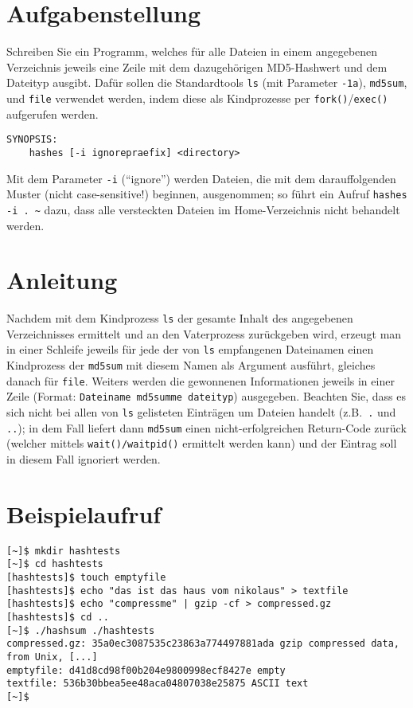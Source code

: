 




\section*{Aufgabenstellung}

Schreiben Sie ein Programm, welches für alle Dateien in einem angegebenen
Verzeichnis jeweils eine Zeile mit dem dazugehörigen MD5-Hashwert und dem
Dateityp ausgibt. Dafür sollen die Standardtools \texttt{ls} (mit Parameter
\texttt{-1a}), \texttt{md5sum}, und \texttt{file} verwendet werden, indem
diese als Kindprozesse per \texttt{fork()}/\texttt{exec()} aufgerufen
werden.


\begin{verbatim}
SYNOPSIS:
	hashes [-i ignorepraefix] <directory>
\end{verbatim}

Mit dem Parameter \verb_-i_ (“ignore”) werden Dateien, die mit dem
darauffolgenden Muster (nicht case-sensitive!) beginnen, ausgenommen;
so führt ein Aufruf \verb_hashes -i . ~_ dazu, dass alle versteckten
Dateien im Home-Verzeichnis nicht behandelt werden.


\section*{Anleitung}
Nachdem mit dem Kindprozess \texttt{ls} der gesamte Inhalt des angegebenen
Verzeichnisses ermittelt und an den Vaterprozess zurückgeben wird, erzeugt man
in einer Schleife jeweils für jede der von \texttt{ls} empfangenen Dateinamen
einen Kindprozess der \texttt{md5sum} mit diesem Namen als Argument ausführt,
gleiches danach für \texttt{file}. Weiters werden die gewonnenen Informationen
jeweils in einer Zeile (Format: \texttt{Dateiname md5summe dateityp})
ausgegeben. Beachten Sie, dass es sich nicht bei allen von \texttt{ls}
gelisteten Einträgen um Dateien handelt (z.B.\ \texttt{.} und \texttt{..}); in dem Fall liefert dann
\texttt{md5sum} einen nicht-erfolgreichen Return-Code zurück (welcher
mittels \texttt{wait()/waitpid()} ermittelt werden kann) und der Eintrag soll in
diesem Fall ignoriert werden.

\section*{Beispielaufruf}
\begin{verbatim}
[~]$ mkdir hashtests
[~]$ cd hashtests
[hashtests]$ touch emptyfile
[hashtests]$ echo "das ist das haus vom nikolaus" > textfile
[hashtests]$ echo "compressme" | gzip -cf > compressed.gz
[hashtests]$ cd ..
[~]$ ./hashsum ./hashtests
compressed.gz: 35a0ec3087535c23863a774497881ada gzip compressed data, from Unix, [...]
emptyfile: d41d8cd98f00b204e9800998ecf8427e empty
textfile: 536b30bbea5ee48aca04807038e25875 ASCII text
[~]$
\end{verbatim}

\osueguidelinestwo


